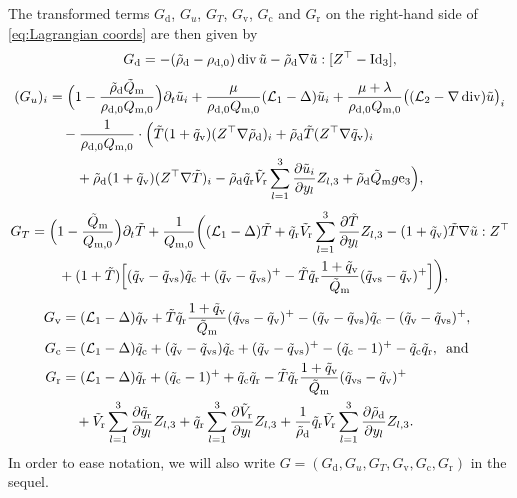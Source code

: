 \documentclass[10pt]{amsart}
\theoremstyle{plain}
\theoremstyle{definition}
\theoremstyle{thm}
\numberwithin{equation}{section}
\newcommand{\cL}{\mathcal{L}}
\DeclareMathOperator{\mdiv}{div}
\newcommand{\mre}{\mathrm{e}}
\newcommand{\del}{\partial}
\newcommand{\tand}{\enspace \text{and} \enspace}
\newcommand{\rd}{\mathrm{d}}
\renewcommand{\rm}{\mathrm{m}}
\newcommand{\rr}{\mathrm{r}}
\newcommand{\rv}{\mathrm{v}}
\newcommand{\rvs}{\mathrm{vs}}
\newcommand{\rc}{\mathrm{c}}
\newcommand{\trho}{\Tilde{\rho}}
\newcommand{\tu}{\Tilde{u}}
\newcommand{\tT}{\Tilde{T}}
\newcommand{\tq}{\Tilde{q}}
\newcommand{\tV}{\Tilde{V}}
\newcommand{\tQ}{\Tilde{Q}}
\begin{document}
The transformed terms $G_\rd$, $G_u$, $G_T$, $G_\rv$, $G_\rc$ and $G_\rr$ on the right-hand side of \eqref{eq:Lagrangian coords} are then given by
\begin{equation*}
    G_\rd = -(\trho_\rd-\rho_{\rd,0})\mdiv\tu-\trho_\rd\nabla\tu:[Z^\top-\mathrm{Id}_3],
\end{equation*}
\begin{equation*}
    \begin{aligned}
        (G_{u})_{i}
        &= \Bigl(1-\frac{\trho_\rd \tQ_\rm}{\rho_{\rd,0}Q_{\rm,0}}\Bigr)\del_t\tu_{i} + \frac{\mu}{\rho_{\rd,0}Q_{\rm,0}} (\cL_1 - \Delta) \tu_i + \frac{\mu+\lambda}{\rho_{\rd,0}Q_{\rm,0}} \bigl((\cL_2 - \nabla \mdiv) \tu\bigr)_i\\
        &\quad -\frac{1}{\rho_{\rd,0}Q_{\rm,0}} \cdot \Bigl(\tT(1+\tq_\rv)(Z^\top\nabla \trho_\rd)_{i}+\trho_\rd\tT(Z^\top\nabla\tq_\rv)_{i}\\
        &\qquad+\trho_\rd(1+\tq_\rv)(Z^\top\nabla \tT)_{i} - \trho_\rd\tq_\rr\tV_\rr\sum_{l=1}^3\frac{\del \tu_i}{\del y_l}Z_{l,3} + \trho_\rd\tQ_\rm g \mre_{3}\Bigr),
    \end{aligned}
\end{equation*}
\begin{equation*}
    \begin{aligned}
        G_T
        &= \Bigl(1-\frac{\tQ_\rm}{Q_{\rm,0}}\Bigr)\del_t\tT + \frac{1}{Q_{\rm,0}} \biggl((\cL_1 - \Delta) \tT + \tq_\rr\tV_\rr\sum_{l=1}^3 \frac{\del\tT}{\del y_{l}} Z_{l,3} - (1+\tq_\rv)\tT\nabla \tu:Z^\top\\
        &\qquad + (1+\tT)\Bigl[(\tq_\rv-\tq_\rvs)\tq_\rc+(\tq_\rv-\tq_\rvs)^{+}-\tT\tq_\rr\frac{1+\tq_\rv}{\tQ_\rm}(\tq_\rvs-\tq_\rv)^{+}\Bigr]\biggr),
    \end{aligned}
\end{equation*}
\begin{equation*}
    \begin{aligned}
        G_\rv
        &= (\cL_1 - \Delta) \tq_\rv +\tT\tq_\rr\frac{1+\tq_\rv}{\tQ_\rm}(\tq_\rvs-\tq_\rv)^{+}-(\tq_\rv-\tq_\rvs)\tq_\rc-(\tq_\rv-\tq_\rvs)^{+},\\
        G_\rc
        &= (\cL_1 - \Delta) \tq_\rc +(\tq_\rv-\tq_\rvs)\tq_\rc+(\tq_\rv-\tq_\rvs)^{+}-(\tq_\rc-1)^{+}-\tq_\rc\tq_\rr, \tand\\
        G_\rr
        &= (\cL_1 - \Delta) \tq_\rr +(\tq_\rc-1)^{+}+\tq_\rc\tq_\rr-\tT\tq_\rr\frac{1+\tq_\rv}{\tQ_\rm}(\tq_\rvs-\tq_\rv)^{+}\\
        &\quad +\tV_\rr\sum_{l=1}^3 \frac{\del \tq_\rr}{\del y_{l}}Z_{l,3} + \tq_\rr\sum_{l=1}^3 \frac{\del \tV_\rr}{\del y_{l}} Z_{l,3}
        +\frac{1}{\trho_\rd}\tq_\rr \tV_\rr\sum_{l=1}^3 \frac{\del \trho_\rd}{\del y_{l}} Z_{l,3}.
    \end{aligned}
\end{equation*}
In order to ease notation, we will also write $G = (G_\rd,G_{u},G_T,G_\rv,G_\rc,G_\rr)$ in the sequel.
\end{document}
